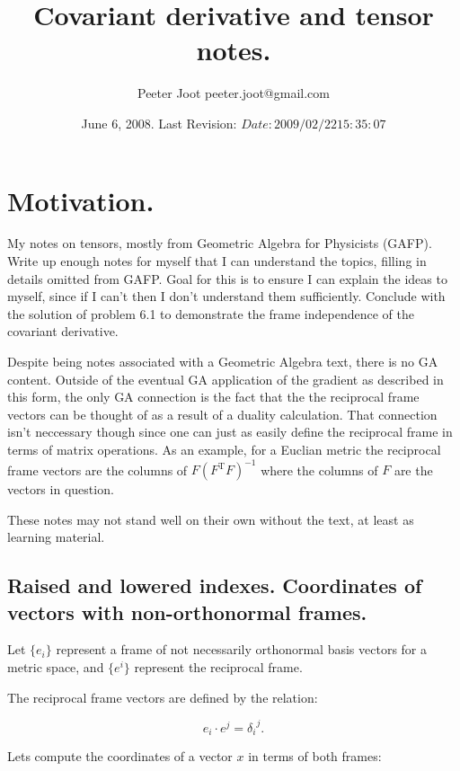 \documentclass{article}      %
\title{ Covariant derivative and tensor notes. }
\author{Peeter Joot \quad peeter.joot@gmail.com}         %
\date{ June 6, 2008.  Last Revision: $Date: 2009/02/22 15:35:07 $ }
\begin{document}

\maketitle{}

\section{Motivation.}

My notes on tensors, mostly from Geometric Algebra for Physicists (GAFP).  Write up enough notes for myself that I can understand the topics, filling in details
omitted from GAFP.  Goal for this is to ensure I can explain the ideas to myself, since if I can't then I don't understand them sufficiently.
Conclude with the
solution of problem 6.1 to demonstrate the frame independence of the
covariant derivative.

Despite being notes associated with a Geometric Algebra text, there is no
GA content.  Outside of the eventual GA application of the gradient as
described in this form, the only GA connection is the fact that the
the reciprocal frame vectors can be thought of as a result of a duality
calculation.  That connection isn't neccessary though since one can just as
easily define the reciprocal frame in terms of matrix operations.  As an example, for a Euclian metric the reciprocal frame vectors are the columns of
$F(F^\text{T}F)^{-1}$ where the columns of $F$ are the vectors in question.

These notes may not stand well on their own without the text, at least
as learning material.

\subsection{ Raised and lowered indexes. Coordinates of vectors with non-orthonormal frames. }

Let $\{ e_i \}$ represent a frame of not necessarily orthonormal basis vectors for a metric space, and $\{ e^i \}$ represent the reciprocal frame.

The reciprocal frame vectors are defined by the relation:

\begin{equation}
e_i \cdot e^j = {\delta_i}^j.
\end{equation}

Lets compute the coordinates of a vector $x$ in terms of both frames:
\end{document}
